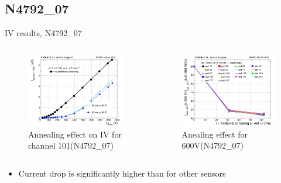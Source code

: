 \documentclass{beamer}
\begin{document}
\subsection{N4792\_07}

\begin{frame}{IV results, N4792\_07}
  \begin{columns}
       \begin{figure}
           \includegraphics[width=1.0\textwidth]{plots/annealing_IV_ch101_N4792_7.png}
           \caption{Annealing effect on IV for channel 101(N4792\_07)}
       \end{figure}
       \begin{figure}
           \includegraphics[width=1.0\textwidth]{plots/annealing_current_N4792_7.png}
           \caption{Anealing effect for 600V(N4792\_07)}
       \end{figure}
   \end{columns}
   \begin{itemize}
    \item Current drop is significantly higher than for other sensors
   \end{itemize}
\end{frame}
\end{document}

